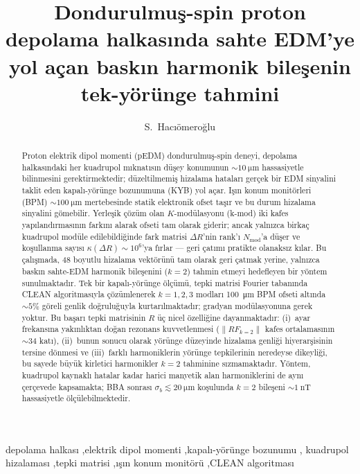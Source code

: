 \documentclass[preprint,12pt]{elsarticle}
\newcommand{\todo}[1]{{\color{red}\textbf{(YAPILACAK: #1)}}}
\begin{document}
\shorthandoff{=}

\begin{frontmatter}

\title{Dondurulmuş-spin proton depolama halkasında sahte EDM'ye yol açan
baskın harmonik bileşenin tek-yörünge tahmini}

\author[inst1]{S.~Hac\i\"omero\u{g}lu}

\address[inst1]{\todo{kurum bilgisi}}

\begin{abstract}
Proton elektrik dipol momenti (pEDM) dondurulmuş-spin deneyi, depolama
halkasındaki her kuadrupol mıknatısın düşey konumunun $\sim\SI{10}{\micro\meter}$
hassasiyetle bilinmesini gerektirmektedir; düzeltilmemiş hizalama hataları gerçek
bir EDM sinyalini taklit eden kapalı-yörünge bozunumuna (KYB) yol açar.
Işın konum monitörleri (BPM) $\sim\SI{100}{\micro\meter}$ mertebesinde statik
elektronik ofset taşır ve bu durum hizalama sinyalini gömebilir.
Yerleşik çözüm olan $K$-modülasyonu (k-mod) iki kafes yapılandırmasının farkını
alarak ofseti tam olarak giderir; ancak yalnızca birkaç kuadrupol modüle
edilebildiğinde fark matrisi $\Delta R$'nin rank'ı $N_\mathrm{mod}$'a
düşer ve koşullanma sayısı $\kappa(\Delta R)\sim10^6$'ya fırlar —
geri çatımı pratikte olanaksız kılar.
Bu çalışmada, 48 boyutlu hizalama vektörünü tam olarak geri çatmak yerine, yalnızca
baskın sahte-EDM harmonik bileşenini ($k=2$) tahmin etmeyi hedefleyen
bir yöntem sunulmaktadır. Tek bir kapalı-yörünge ölçümü, tepki matrisi Fourier
tabanında CLEAN algoritmasıyla çözümlenerek $k=1,2,3$ modları \SI{100}{\micro\meter}
BPM ofseti altında $\sim5\%$ göreli genlik doğruluğuyla kurtarılmaktadır; gradyan
modülasyonuna gerek yoktur. Bu başarı tepki matrisinin $R$ üç nicel özelliğine
dayanmaktadır: (i)~ayar frekansına yakınlıktan doğan rezonans kuvvetlenmesi
($\|RF_{k=2}\|$ kafes ortalamasının $\sim34$ katı), (ii)~bunun sonucu olarak
yörünge düzeyinde hizalama genliği hiyerarşisinin tersine dönmesi ve
(iii)~farklı harmoniklerin yörünge tepkilerinin neredeyse dikeyliği, bu sayede
büyük kirletici harmonikler $k=2$ tahminine sızmamaktadır.
Yöntem, kuadrupol kaynaklı hatalar kadar harici manyetik alan harmoniklerini de
aynı çerçevede kapsamakta; BBA sonrası $\sigma_b\lesssim\SI{20}{\micro\meter}$
koşulunda $k=2$ bileşeni $\sim\SI{1}{\nano\tesla}$ hassasiyetle ölçülebilmektedir.
\end{abstract}

\begin{keyword}
depolama halkası \sep elektrik dipol momenti \sep kapalı-yörünge bozunumu \sep
kuadrupol hizalaması \sep tepki matrisi \sep ışın konum monitörü \sep CLEAN algoritması
\end{keyword}

\end{frontmatter}
\end{document}
